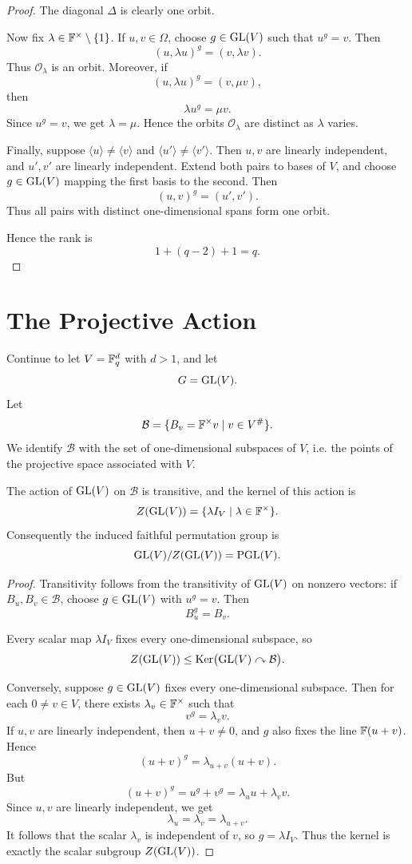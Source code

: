 \begin{proof}
The diagonal \(\Delta\) is clearly one orbit.

Now fix \(\lambda\in \mathbb{F}^\times\setminus\{1\}\). If \(u,v\in \Omega\), choose
\(g\in \operatorname{GL}(V)\) such that \(u^g=v\). Then
\[
    (u,\lambda u)^g=(v,\lambda v).
\]
Thus \(\mathcal O_\lambda\) is an orbit. Moreover, if
\[
    (u,\lambda u)^g=(v,\mu v),
\]
then
\[
    \lambda u^g=\mu v.
\]
Since \(u^g=v\), we get \(\lambda=\mu\). Hence the orbits
\(\mathcal O_\lambda\) are distinct as \(\lambda\) varies.

Finally, suppose \(\langle u\rangle\neq \langle v\rangle\) and
\(\langle u'\rangle\neq \langle v'\rangle\). Then \(u,v\) are linearly independent,
and \(u',v'\) are linearly independent. Extend both pairs to bases of \(V\), and
choose \(g\in \operatorname{GL}(V)\) mapping the first basis to the second. Then
\[
    (u,v)^g=(u',v').
\]
Thus all pairs with distinct one-dimensional spans form one orbit.

Hence the rank is
\[
    1+(q-2)+1=q.
\]
\end{proof}

\section{The Projective Action}

Continue to let \(V=\mathbb{F}_q^d\) with \(d>1\), and let
\[
    G=\operatorname{GL}(V).
\]
Let
\[
    \mathcal B
    =
    \{B_v=\mathbb{F}^\times v\mid v\in V^\#\}.
\]
We identify \(\mathcal B\) with the set of one-dimensional subspaces of \(V\), i.e.
the points of the projective space associated with \(V\).

\begin{proposition}
The action of \(\operatorname{GL}(V)\) on \(\mathcal B\) is transitive, and the kernel of this
action is
\[
    Z(\operatorname{GL}(V))=\{\lambda I_V\mid \lambda\in \mathbb{F}^\times\}.
\]
Consequently the induced faithful permutation group is
\[
    \operatorname{GL}(V)/Z(\operatorname{GL}(V))=\operatorname{PGL}(V).
\]
\end{proposition}

\begin{proof}
Transitivity follows from the transitivity of \(\operatorname{GL}(V)\) on nonzero vectors:
if \(B_u,B_v\in \mathcal B\), choose \(g\in \operatorname{GL}(V)\) with \(u^g=v\). Then
\[
    B_u^g=B_v.
\]

Every scalar map \(\lambda I_V\) fixes every one-dimensional subspace, so
\[
    Z(\operatorname{GL}(V))\leq \operatorname{Ker}\bigl(\operatorname{GL}(V)\curvearrowright \mathcal B\bigr).
\]

Conversely, suppose \(g\in \operatorname{GL}(V)\) fixes every one-dimensional subspace.
Then for each \(0\neq v\in V\), there exists \(\lambda_v\in \mathbb{F}^\times\) such that
\[
    v^g=\lambda_v v.
\]
If \(u,v\) are linearly independent, then \(u+v\neq 0\), and \(g\) also fixes the
line \(\mathbb{F}(u+v)\). Hence
\[
    (u+v)^g=\lambda_{u+v}(u+v).
\]
But
\[
    (u+v)^g=u^g+v^g=\lambda_u u+\lambda_v v.
\]
Since \(u,v\) are linearly independent, we get
\[
    \lambda_u=\lambda_v=\lambda_{u+v}.
\]
It follows that the scalar \(\lambda_v\) is independent of \(v\), so \(g=\lambda I_V\).
Thus the kernel is exactly the scalar subgroup \(Z(\operatorname{GL}(V))\).
\end{proof}

